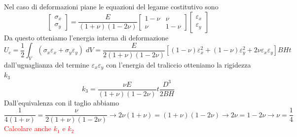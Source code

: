 \documentclass[a4paper]{article}
\begin{document}
Nel caso di deformazioni piane le equazioni del legame costitutivo sono
$$
\begin{bmatrix} \sigma_x \\ \sigma_y \end{bmatrix} = 
\frac{E}{(1+\nu)(1-2\nu)}
\begin{bmatrix}
1-\nu & \nu \\
\nu & 1-\nu
\end{bmatrix}
\begin{bmatrix} \varepsilon_x \\ \varepsilon_y \end{bmatrix}
$$
Da questo otteniamo l'energia interna di deformazione
$$
U_c = \frac{1}{2}\int_V (\sigma_x\varepsilon_x + \sigma_y\varepsilon_y) \; dV = 
\frac{E}{2(1+\nu)(1-2\nu)}\left[ (1-\nu)\varepsilon_x^2 + (1-\nu)\varepsilon_y^2 + 2\nu\varepsilon_x\varepsilon_y \right] BHt
$$
dall'uguaglianza del termine $\varepsilon_x\varepsilon_y$ con l'energia del traliccio otteniamo la rigidezza $k_3$
$$ k_3 = \frac{\nu E}{(1+\nu)(1-2\nu)} t \frac{D^3}{2BH} $$
Dall'equivalenza con il taglio abbiamo
$$
\frac{1}{4(1+\nu)} = \frac{\nu}{2(1+\nu)(1-2\nu)} \rightarrow
2\nu(1+\nu) = (1+\nu)(1-2\nu) \rightarrow
2\nu = 1-2\nu \rightarrow
\nu = \frac{1}{4}
$$
\textcolor{red}{Calcolare anche $k_1$ e $k_2$}
\end{document}
